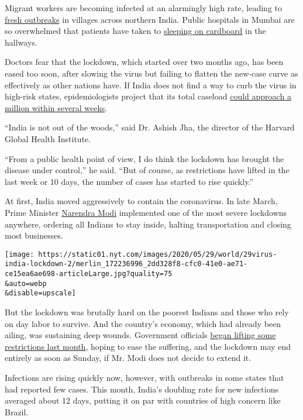 Migrant workers are becoming infected at an alarmingly high rate,
leading to
\href{https://indianexpress.com/article/coronavirus/up-migrants-coronavirus-6423381/}{fresh
outbreaks} in villages across northern India. Public hospitals in Mumbai
are so overwhelmed that patients have taken to
\href{https://twitter.com/BDUTT/status/1264942589448384512}{sleeping on
cardboard} in the hallways.

Doctors fear that the lockdown, which started over two months ago, has
been eased too soon, after slowing the virus but failing to flatten the
new-case curve as effectively as other nations have. If India does not
find a way to curb the virus in high-risk states, epidemiologists
project that its total caseload
\href{https://www.reuters.com/article/us-health-coronavirus-india-medics-insig/more-patients-than-beds-in-mumbai-as-india-faces-surge-in-virus-cases-idUSKBN23103F}{could
approach a million within several weeks}.

``India is not out of the woods,'' said Dr. Ashish Jha, the director of
the Harvard Global Health Institute.

``From a public health point of view, I do think the lockdown has
brought the disease under control,'' he said. ``But of course, as
restrictions have lifted in the last week or 10 days, the number of
cases has started to rise quickly.''

At first, India moved aggressively to contain the coronavirus. In late
March, Prime Minister
\href{https://www.nytimes.com/2020/06/17/world/asia/india-china-border-clashes.html}{Narendra
Modi} implemented one of the most severe lockdowns anywhere, ordering
all Indians to stay inside, halting transportation and closing most
businesses.

\texttt{[image: https://static01.nyt.com/images/2020/05/29/world/29virus-india-lockdown-2/merlin\_172236996\_2dd328f8-cfc0-41e0-ae71-ce15ea6ae698-articleLarge.jpg?quality=75\\\&auto=webp\\\&disable=upscale]}

But the lockdown was brutally hard on the poorest Indians and those who
rely on day labor to survive. And the country's economy, which had
already been ailing, was sustaining deep wounds. Government officials
\href{https://www.nytimes.com/2020/05/06/world/asia/india-coronavirus-lockdown-infections.html}{began
lifting some restrictions last month}, hoping to ease the suffering, and
the lockdown may end entirely as soon as Sunday, if Mr. Modi does not
decide to extend it.

Infections are rising quickly now, however, with outbreaks in some
states that had reported few cases. This month, India's doubling rate
for new infections averaged about 12 days, putting it on par with
countries of high concern like Brazil.

